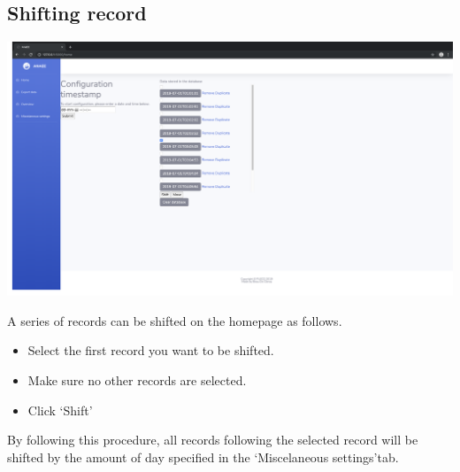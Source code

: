 \documentclass[12pt]{article}
\begin{document}
\subsection{Shifting record}
\begin{center}
	\includegraphics[width=\linewidth]{images/Shift_entries.png}
\end{center}
A series of records can be shifted on the homepage as follows.
\begin{itemize}
	\item Select the first record you want to be shifted.
	\item Make sure no other records are selected.
	\item Click \lq Shift\rq
\end{itemize}
By following this procedure, all records following the selected record will be shifted by the amount of day specified in the \lq Miscelaneous settings\rq tab.
\end{document}
